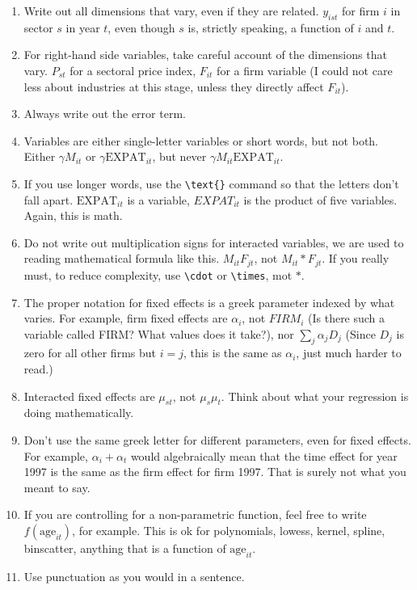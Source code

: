 \documentclass[12pt,a4paper]{article}
\begin{document}
\begin{enumerate}
	\item  Write out all dimensions that vary, even if they are related. $y_{ist}$ for firm $i$ in sector $s$ in year $t$, even though $s$ is, strictly speaking, a function of $i$ and $t$.
	\item For right-hand side variables, take careful account of the dimensions that vary. $P_{st}$ for a sectoral price index, $F_{it}$ for a firm variable (I could not care less about industries at this stage, unless they directly affect $F_{it}$).
	\item Always write out the error term. 
	\item Variables are either single-letter variables or short words, but not both. Either $\gamma M_{it}$ or $\gamma \text{EXPAT}_{it}$, but never $\gamma M_{it}\text{EXPAT}_{it}$. 
	\item If you use longer words, use the \texttt{\textbackslash text\{\}} command so that the letters don't fall apart. $\text{EXPAT}_{it}$ is a variable, $EXPAT_{it}$ is the product of five variables. Again, this is math.
	\item Do not write out multiplication signs for interacted variables, we are used to reading mathematical formula like this. $M_{it}F_{jt}$, not $M_{it}*F_{jt}$. If you really must, to reduce complexity, use \texttt{\textbackslash cdot} or \texttt{\textbackslash times}, mot $*$.
	\item The proper notation for fixed effects is a greek parameter indexed by what varies. For example, firm fixed effects are $\alpha_i$, not $FIRM_i$ (Is there such a variable called FIRM? What values does it take?), nor $\sum_j \alpha_j D_j$ (Since $D_j$ is zero for all other firms but $i=j$, this is the same as $\alpha_i$, just much harder to read.)

	\item Interacted fixed effects are $\mu_{st}$, not $\mu_s\mu_t$. Think about what your regression is doing mathematically.

	\item Don't use the same greek letter for different parameters, even for fixed effects. For example, $\alpha_i + \alpha_t$ would algebraically mean that the time effect for year 1997 is the same as the firm effect for firm 1997. That is surely not what you meant to say.

	\item If you are controlling for a non-parametric function, feel free to write $f(\text{age}_{it})$, for example. This is ok for polynomials, lowess, kernel, spline, binscatter, anything that is a function of $\text{age}_{it}$.

	\item Use punctuation as you would in a sentence.
\end{enumerate}
\end{document}
